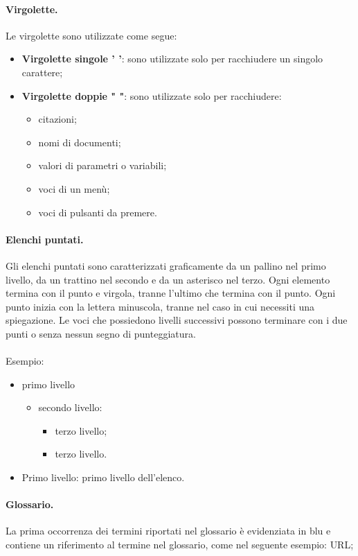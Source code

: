 \paragraph{Virgolette.}Le virgolette sono utilizzate come segue:
 \begin{itemize}
 	\item \textbf{Virgolette singole ' '}: sono utilizzate solo per racchiudere un singolo carattere;
 	\item \textbf{Virgolette doppie " "}: sono utilizzate solo per racchiudere:
 	\begin{itemize}
 		\item citazioni;
 		\item nomi di documenti;
 		\item valori di parametri o variabili;
 		\item voci di un menù;
 		\item voci di pulsanti da premere.
 	\end{itemize}
 \end{itemize}


\paragraph{Elenchi puntati.}Gli elenchi puntati sono caratterizzati graficamente da un pallino nel primo livello, da un
trattino nel secondo e da un asterisco nel terzo.
Ogni elemento termina con il punto e virgola, tranne l'ultimo che termina con il punto. Ogni punto inizia con la lettera minuscola, tranne nel caso in cui necessiti una spiegazione.
Le voci che possiedono livelli successivi possono terminare con i due punti o senza nessun segno di punteggiatura.
\\
\\Esempio:
\begin{itemize}
	\item primo livello
		\begin{itemize}
			\item secondo livello:
			\begin{itemize}
				\item terzo livello;
				\item terzo livello.
			\end{itemize}
		\end{itemize}
	\item Primo livello: primo livello dell'elenco.
\end{itemize}


\paragraph{Glossario.}La prima occorrenza dei termini riportati nel glossario è evidenziata in blu e contiene un riferimento al termine nel glossario, come nel seguente esempio: \gls{URL};
